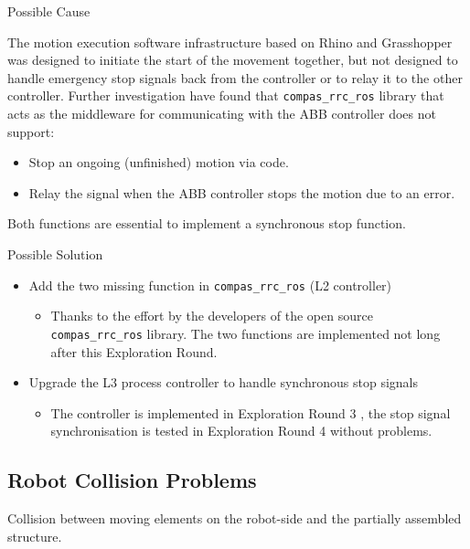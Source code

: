 Possible Cause

The motion execution software infrastructure based on Rhino and Grasshopper was designed to initiate the start of the movement together, but not designed to handle emergency stop signals back from the controller or to relay it to the other controller.
Further investigation have found that \verb|compas_rrc_ros| library that acts as the middleware for communicating with the ABB controller does not support:
\begin{itemize}
    \item Stop an ongoing (unfinished) motion via code.
    \item Relay the signal when the ABB controller stops the motion due to an error. 
\end{itemize}

Both functions are essential to implement a synchronous stop function.

Possible Solution

\begin{itemize}
    \item Add the two missing function in \verb|compas_rrc_ros| (L2 controller)
    \begin{itemize}
        \item Thanks to the effort by the developers of the open source \verb|compas_rrc_ros| library. The two functions are implemented not long after this Exploration Round. 
    \end{itemize}
    \item Upgrade the L3 process controller to handle synchronous stop signals
    \begin{itemize}
        \item The controller is implemented in Exploration Round 3 , the stop signal synchronisation is tested in Exploration Round 4 without problems.
    \end{itemize}
\end{itemize}

\subsection{Robot Collision Problems}
\label{subsection:exploration-2-robot-collision-problems}

Collision between moving elements on the robot-side and the partially assembled structure.


